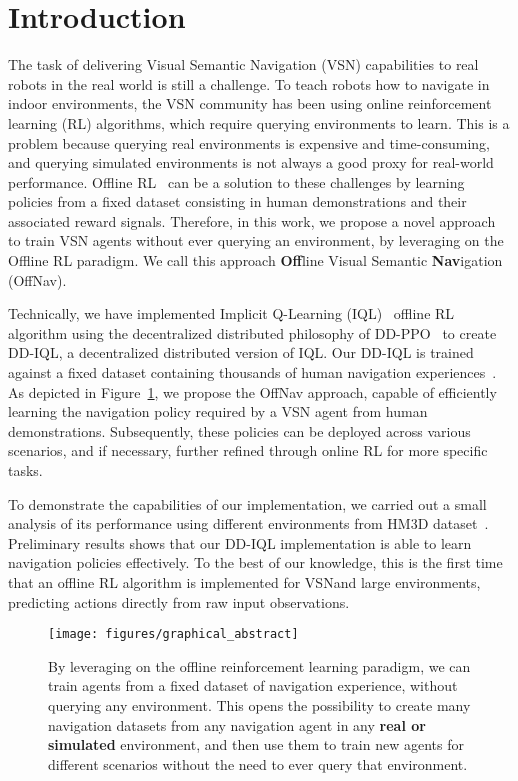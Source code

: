 \section{Introduction}\label{sec:introduction}

The task of delivering Visual Semantic Navigation (VSN) capabilities to real robots in the real world is still a challenge.
To teach robots how to navigate in indoor environments, the VSN community has been using online reinforcement learning (RL) algorithms, which require querying environments to learn.
This is a problem because querying real environments is expensive and time-consuming, and querying simulated environments is not always a good proxy for real-world performance.
Offline RL~\cite{levine2020} can be a solution to these challenges by learning policies from a fixed dataset consisting in human demonstrations and their associated reward signals.
Therefore, in this work, we propose a novel approach to train VSN agents without ever querying an environment, by leveraging on the Offline RL paradigm.
We call this approach \textbf{Off}line Visual Semantic \textbf{Nav}igation (OffNav).

Technically, we have implemented Implicit Q-Learning (IQL)~\cite{kostrikov2022offline} offline RL algorithm using the decentralized distributed philosophy of DD-PPO~\cite{wijmans2020} to create DD-IQL, a decentralized distributed version of IQL\@.
Our DD-IQL is trained against a fixed dataset containing thousands of human navigation experiences~\cite{ramrakhya2023}.
As depicted in Figure~\ref{fig:abstract}, we propose the OffNav approach, capable of efficiently learning the navigation policy required by a VSN agent from human demonstrations.
Subsequently, these policies can be deployed across various scenarios, and if necessary, further refined through online RL for more specific tasks.

To demonstrate the capabilities of our implementation, we carried out a small analysis of its performance using different environments from HM3D dataset~\cite{Ramakrishnan2021HabitatMatterport3D}.
Preliminary results shows that our DD-IQL implementation is able to learn navigation policies effectively.
To the best of our knowledge, this is the first time that an offline RL algorithm is implemented for VSN\@ and large environments, predicting actions directly from raw input observations.

\begin{figure}
    \centering
    \texttt{[image: figures/graphical\_abstract]}
    \caption{
    By leveraging on the offline reinforcement learning paradigm, we can train agents from a fixed dataset of navigation experience, without querying any environment.
    This opens the possibility to create many navigation datasets from any navigation agent in any \textbf{real or simulated} environment, and then use them to train new agents for different scenarios without the need to ever query that environment.
    }
    \label{fig:abstract}
\end{figure}

